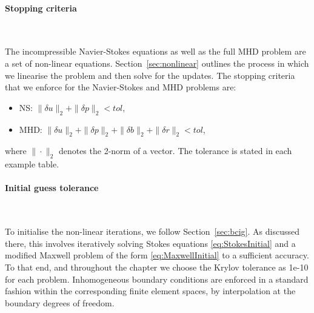 \newpage

\paragraph{Stopping criteria} ~\\

\vspace{-5mm}


The incompressible Navier-Stokes equations as well as the full MHD problem are a set of non-linear equations. Section~\ref{sec:nonlinear} outlines the process in which we linearise the problem and then solve for the updates. The stopping criteria that we enforce for the Navier-Stokes and MHD problems are:
\begin{itemize}
  \item NS: $\|\delta {u} \|_2+\|\delta p \|_{2} < {tol}$,
  \item MHD: $\|\delta {u} \|_{2}+\|\delta p \|_{2}+\|\delta {b} \|_{2}+\|\delta r \|_{2} < {tol}$,
\end{itemize}
where $\|\cdot \|_2$ denotes the 2-norm of a vector. The tolerance is stated in each example table.



\paragraph{Initial guess tolerance} ~\\


\vspace{-5mm}

To initialise the non-linear iterations, we follow Section~\ref{sec:bcig}. As discussed there, this involves iteratively solving  Stokes equations \eqref{eq:StokesInitial} and a modified Maxwell problem of the form \eqref{eq:MaxwellInitial} to a sufficient accuracy. To that end, and throughout the chapter we choose the Krylov tolerance as 1e-10 for each problem. Inhomogeneous boundary conditions are enforced in a standard fashion within the corresponding finite element spaces, by interpolation at the boundary degrees of freedom.


